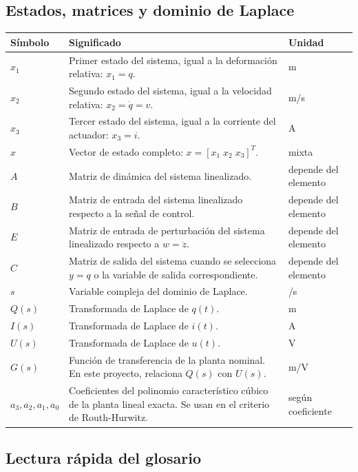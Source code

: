 \documentclass[11pt]{article}
\begin{document}
\subsection{Estados, matrices y dominio de Laplace}

\begin{center}
\small
\begin{tabular}{>{\raggedright\arraybackslash}p{3.0cm} >{\raggedright\arraybackslash}p{9.0cm} >{\raggedright\arraybackslash}p{2.2cm}}
\toprule
\textbf{S\'imbolo} & \textbf{Significado} & \textbf{Unidad} \\
\midrule
$x_1$ & Primer estado del sistema, igual a la deformaci\'on relativa: $x_1=q$. & m \\
$x_2$ & Segundo estado del sistema, igual a la velocidad relativa: $x_2=\dot q=v$. & m/s \\
$x_3$ & Tercer estado del sistema, igual a la corriente del actuador: $x_3=i$. & A \\
$x$ & Vector de estado completo: $x=[x_1\;x_2\;x_3]^T$. & mixta \\
$A$ & Matriz de din\'amica del sistema linealizado. & depende del elemento \\
$B$ & Matriz de entrada del sistema linealizado respecto a la se\~nal de control. & depende del elemento \\
$E$ & Matriz de entrada de perturbaci\'on del sistema linealizado respecto a $w=\ddot z$. & depende del elemento \\
$C$ & Matriz de salida del sistema cuando se selecciona $y=q$ o la variable de salida correspondiente. & depende del elemento \\
$s$ & Variable compleja del dominio de Laplace. & 1/s \\
$Q(s)$ & Transformada de Laplace de $q(t)$. & m \\
$I(s)$ & Transformada de Laplace de $i(t)$. & A \\
$U(s)$ & Transformada de Laplace de $u(t)$. & V \\
$G(s)$ & Funci\'on de transferencia de la planta nominal. En este proyecto, relaciona $Q(s)$ con $U(s)$. & m/V \\
$a_3,a_2,a_1,a_0$ & Coeficientes del polinomio caracter\'istico c\'ubico de la planta lineal exacta. Se usan en el criterio de Routh-Hurwitz. & seg\'un coeficiente \\
\bottomrule
\end{tabular}
\end{center}

\subsection{Lectura r\'apida del glosario}
\end{document}
